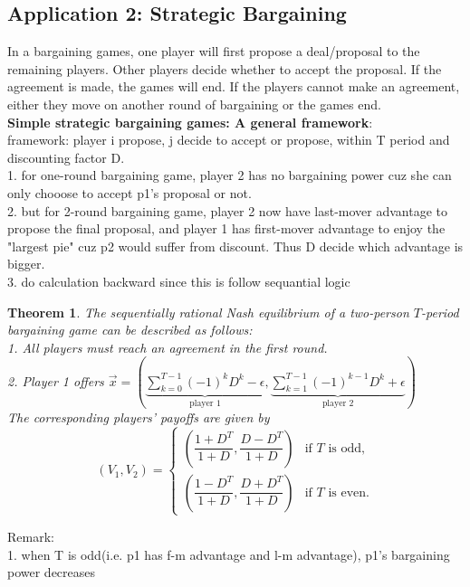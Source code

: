 \documentclass[twoside]{article}
\theoremstyle{definitionstyle}
\newtheorem*{theorem}{Theorem}
\begin{document}
\subsection{Application 2: Strategic Bargaining}
In a bargaining games, one player will first propose a deal/proposal to the remaining players. Other players decide whether to accept the proposal. If the agreement is made, the games will end. If the players cannot make an agreement, either they move on another round of bargaining or the games end.  \\
\newline
\textbf{Simple strategic bargaining games: A general framework}:\\
framework: player i propose, j decide to accept or propose, within T period and discounting factor D.\\
1. for one-round bargaining game, player 2 has no bargaining power cuz she can only chooose to accept p1's proposal or not.\\
2. but for 2-round bargaining game, player 2 now have last-mover advantage to propose the final proposal, and player 1 has first-mover advantage to enjoy the "largest pie" cuz p2 would suffer from discount. Thus D decide which advantage is bigger. \\
3. do calculation backward since this is follow sequantial logic\\
\begin{theorem}
  The sequentially rational Nash equilibrium of a two-person $T$-period bargaining game can be described as follows:\\
1. All players must reach an agreement in the first round.\\
2. Player 1 offers $\vec{x} = \left( \underbrace{\sum_{k=0}^{T-1} (-1)^k D^k - \epsilon}_{\text{player 1}}, \underbrace{\sum_{k=1}^{T-1} (-1)^{k-1} D^k+ \epsilon}_{\text{player 2}}  \right)$\\
The corresponding players' payoffs are given by
\[
(V_1, V_2) = 
\begin{cases}
\left( \dfrac{1 + D^T}{1 + D}, \dfrac{D - D^T}{1 + D} \right) & \text{if } T \text{ is odd}, \\[2ex]
\left( \dfrac{1 - D^T}{1 + D}, \dfrac{D + D^T}{1 + D} \right) & \text{if } T \text{ is even}.
\end{cases}
\]
\end{theorem}
Remark:\\
1. when T is odd(i.e. p1 has f-m advantage and l-m advantage), p1's bargaining power decreases\\
\end{document}
